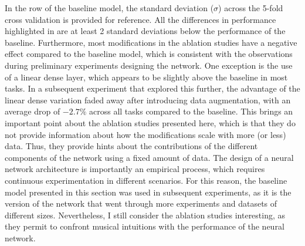 In the row of the baseline model, the standard deviation
($\sigma$) across the 5-fold cross validation is provided
for reference. All the differences in performance
highlighted in  are at least 2 standard
deviations below the performance of the baseline.
Furthermore, most modifications in the ablation studies have
a negative effect compared to the baseline model, which is
consistent with the observations during preliminary
experiments designing the network. One exception is the use
of a linear dense layer, which appears to be slightly above
the baseline in most tasks. In a subsequent experiment that
explored this further, the advantage of the linear dense
variation faded away after introducing data augmentation,
with an average drop of $-2.7\%$ across all tasks compared
to the baseline. This brings an important point about the
ablation studies presented here, which is that they do not
provide information about how the modifications scale with
more (or less) data. Thus, they provide hints about the
contributions of the different components of the network
using a fixed amount of data. The design of a neural network
architecture is importantly an empirical process, which
requires continuous experimentation in different scenarios.
For this reason, the baseline model presented in this
section was used in subsequent experiments, as it is the
version of the network that went through more experiments
and datasets of different sizes. Nevertheless, I still
consider the ablation studies interesting, as they permit to
confront musical intuitions with the performance of the
neural network. 
